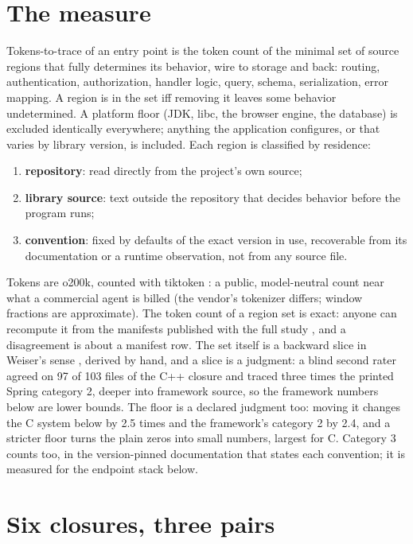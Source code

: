 \documentclass[journal]{IEEEtran}
\begin{document}
\section*{The measure}

Tokens-to-trace of an entry point is the token count of the minimal set
of source regions that fully determines its behavior, wire to storage
and back: routing, authentication, authorization, handler logic, query,
schema, serialization, error mapping. A region is in the set iff
removing it leaves some behavior undetermined. A platform floor (JDK,
libc, the browser engine, the database) is excluded identically
everywhere; anything the application configures, or that varies by
library version, is included. Each region is classified by residence:

\begin{enumerate}[nosep]
\item \textbf{repository}: read directly from the project's own source;
\item \textbf{library source}: text outside the repository that decides
behavior before the program runs;
\item \textbf{convention}: fixed by defaults of the exact version in
use, recoverable from its documentation or a runtime observation, not
from any source file.
\end{enumerate}

Tokens are o200k, counted with tiktoken \cite{tiktoken}: a public,
model-neutral count near what a commercial agent is billed (the
vendor's tokenizer differs; window fractions are approximate). The token count of a region set is exact: anyone can
recompute it from the manifests published with the full study
\cite{full}, and a disagreement is about a manifest row. The set itself
is a backward slice in Weiser's sense \cite{weiser}, derived by hand,
and a slice is a judgment: a blind second rater agreed on 97 of 103
files of the C++ closure and traced three times the printed Spring
category 2, deeper into framework source, so the framework numbers
below are lower bounds. The floor is a declared judgment
too: moving it changes the C system below by 2.5 times and the
framework's category 2 by 2.4, and a stricter floor turns the plain
zeros into small numbers, largest for C. Category 3 counts too, in the
version-pinned documentation that states each convention; it is
measured for the endpoint stack below.

\section*{Six closures, three pairs}
\end{document}
